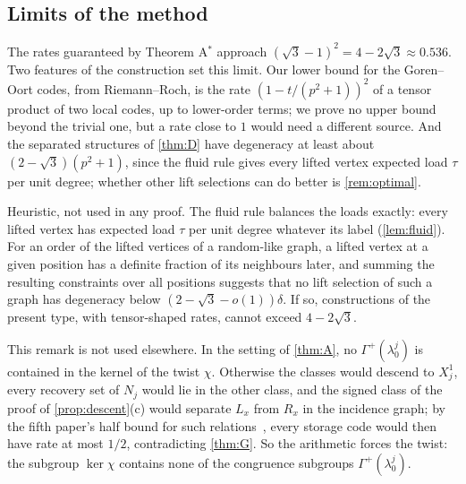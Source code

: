 \subsection{Limits of the method}\label{sec:limits-method}

The rates guaranteed by Theorem A$^*$ approach $(\sqrt3-1)^2=4-2\sqrt3\approx0.536$. Two features of the construction set
this limit. Our lower bound for the Goren--Oort codes, from Riemann--Roch, is the rate $(1-t/(p^2+1))^2$ of a tensor
product of two local codes, up to lower-order terms; we prove no upper bound beyond the trivial one, but a rate close to
$1$ would need a different source. And the separated structures of \cref{thm:D} have degeneracy at least about
$(2-\sqrt3)(p^2+1)$, since the fluid rule gives every lifted vertex expected load $\tau$ per unit degree; whether other
lift selections can do better is \cref{rem:optimal}.

\begin{remark}\label{rem:optimal}
Heuristic, not used in any proof. The fluid rule balances the loads exactly: every lifted vertex has expected load
$\tau$ per unit degree whatever its label (\cref{lem:fluid}). For an order of the lifted vertices of a random-like graph,
a lifted vertex at a given position has a definite fraction of its neighbours later, and summing the resulting
constraints over all positions suggests that no lift selection of such a graph has degeneracy below
$(2-\sqrt3-o(1))\delta$. If so, constructions of the present type, with tensor-shaped rates, cannot exceed $4-2\sqrt3$.
\end{remark}

\begin{remark}\label{rem:untwisted}
This remark is not used elsewhere. In the setting of \cref{thm:A}, no $\Gamma^+(\lambda_0^j)$ is contained in the kernel of
the twist $\chi$. Otherwise the classes would descend to $X_j^1$, every recovery set of $N_j$ would lie in the other class,
and the signed class of the proof of \cref{prop:descent}(c) would separate $L_x$ from $R_x$ in the incidence graph; by the
fifth paper's half bound for such relations~\cite[Lemma~4.1]{DirectedRecovery2026}, every storage code would then have rate
at most $1/2$, contradicting \cref{thm:G}. So the arithmetic forces the twist: the subgroup $\ker\chi$ contains none of
the congruence subgroups $\Gamma^+(\lambda_0^j)$.
\end{remark}

